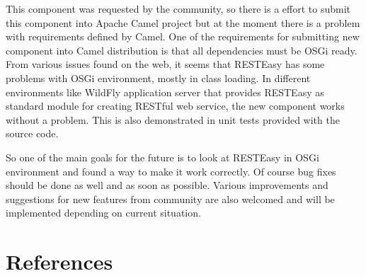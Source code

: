\documentclass[12pt,final,oneside]{fithesis2}
\begin{document}
This component was requested by the community, so there is a effort to submit this component into Apache Camel project but at the moment there is a problem with requirements defined by Camel. One of the requirements for submitting new component into Camel distribution is that all dependencies must be OSGi ready. From various issues found on the web, it seems that RESTEasy has some problems with OSGi environment, mostly in class loading. In different environments like WildFly application server that provides RESTEasy as standard module for creating RESTful web service, the new component works without a problem. This is also demonstrated in unit tests provided with the source code. 

So one of the main goals for the future is to look at RESTEasy in OSGi environment and found a way to make it work correctly. Of course bug fixes should be done as well and as soon as possible. Various improvements and suggestions for new features from community are also welcomed and will be implemented depending on current situation.







\begingroup
\def\tmpchapter{0}
\renewcommand{\chaptername}{}
\renewcommand{\thechapter}{}
\chapter{References}
\renewcommand{\chapter}[2]{}%



\end{document}
